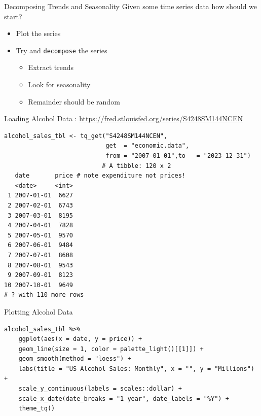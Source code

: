 \begin{frame}{Decomposing Trends and Seasonality}
Given some time series data how should we start?
\begin{itemize}
\item Plot the series
\item Try and \texttt{decompose} the series
\begin{itemize}
\item Extract \alert{trends}
\item Look for \alert{seasonality}
\item Remainder should be \alert{random}
\end{itemize}
\end{itemize}
\end{frame}

\begin{frame}[fragile]{Loading Alcohol Data : }
\small
\url{https://fred.stlouisfed.org/series/S4248SM144NCEN}
\begin{verbatim}
alcohol_sales_tbl <- tq_get("S4248SM144NCEN", 
                            get  = "economic.data", 
                            from = "2007-01-01",to   = "2023-12-31")
                           # A tibble: 120 x 2
   date       price # note expenditure not prices!
   <date>     <int>
 1 2007-01-01  6627
 2 2007-02-01  6743
 3 2007-03-01  8195
 4 2007-04-01  7828
 5 2007-05-01  9570
 6 2007-06-01  9484
 7 2007-07-01  8608
 8 2007-08-01  9543
 9 2007-09-01  8123
10 2007-10-01  9649
# ? with 110 more rows
\end{verbatim}
\end{frame}

\begin{frame}[fragile]{Plotting Alcohol Data}
\small
\begin{verbatim}
alcohol_sales_tbl %>%
    ggplot(aes(x = date, y = price)) +
    geom_line(size = 1, color = palette_light()[[1]]) +
    geom_smooth(method = "loess") +
    labs(title = "US Alcohol Sales: Monthly", x = "", y = "Millions") +
    scale_y_continuous(labels = scales::dollar) +
    scale_x_date(date_breaks = "1 year", date_labels = "%Y") +
    theme_tq()
\end{verbatim}
\end{frame}

